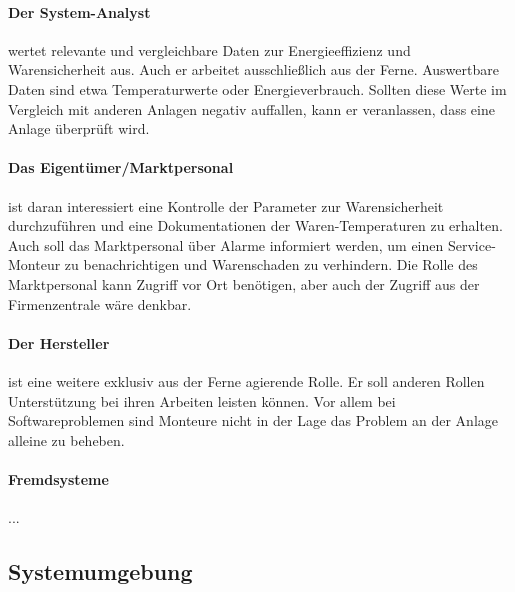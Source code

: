 \documentclass[11pt,a4paper]{report}
\begin{document}
\paragraph{Der System-Analyst} wertet relevante und vergleichbare Daten zur Energieeffizienz und Warensicherheit aus. Auch er arbeitet ausschließlich aus der Ferne. Auswertbare Daten sind etwa Temperaturwerte oder Energieverbrauch. Sollten diese Werte im Vergleich mit anderen Anlagen negativ auffallen, kann er veranlassen, dass eine Anlage überprüft wird.

\paragraph{Das Eigentümer/Marktpersonal} ist daran interessiert eine Kontrolle der Parameter zur Warensicherheit durchzuführen und eine Dokumentationen der Waren-Temperaturen zu erhalten. Auch soll das Marktpersonal über Alarme informiert werden, um einen Service-Monteur zu benachrichtigen und Warenschaden zu verhindern. Die Rolle des Marktpersonal kann Zugriff vor Ort benötigen, aber auch der Zugriff aus der Firmenzentrale wäre denkbar.

\paragraph{Der Hersteller} ist eine weitere exklusiv aus der Ferne agierende Rolle. Er soll anderen Rollen Unterstützung bei ihren Arbeiten leisten können. Vor allem bei Softwareproblemen sind Monteure nicht in der Lage das Problem an der Anlage alleine zu beheben.

\paragraph{Fremdsysteme} ...


\subsection{Systemumgebung}
\end{document}
